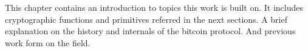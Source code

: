 \begin{mychapterabstract}
        This chapter contains an introduction to topics this work is built
        on.
        It includes cryptographic functions and primitives referred in the
        next sections.
        A brief explanation on the history and internals of the bitcoin
        protocol. And previous work form on the field.
\end{mychapterabstract}
